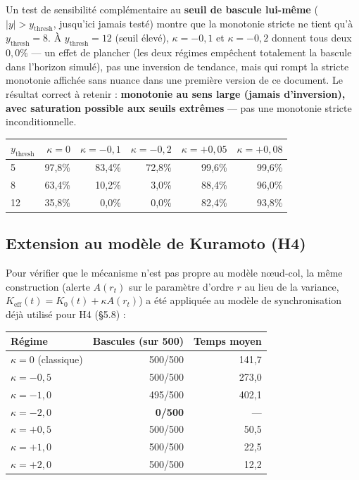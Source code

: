 \documentclass[11pt,a4paper]{article}
\begin{document}
\begin{remarque}
Un test de sensibilité complémentaire au \textbf{seuil de bascule
lui-même} ($|y|>y_{\text{thresh}}$, jusqu'ici jamais testé) montre que la
monotonie stricte ne tient qu'à $y_{\text{thresh}}=8$. À
$y_{\text{thresh}}=12$ (seuil élevé), $\kappa=-0{,}1$ et $\kappa=-0{,}2$
donnent tous deux $0{,}0\%$ — un effet de plancher (les deux régimes
empêchent totalement la bascule dans l'horizon simulé), pas une
inversion de tendance, mais qui rompt la stricte monotonie affichée sans
nuance dans une première version de ce document. Le résultat correct à
retenir : \textbf{monotonie au sens large (jamais d'inversion), avec
saturation possible aux seuils extrêmes} — pas une monotonie stricte
inconditionnelle.
\begin{center}
\begin{tabular}{@{}lrrrrr@{}}
\toprule
$y_{\text{thresh}}$ & $\kappa{=}0$ & $\kappa{=}{-}0{,}1$ & $\kappa{=}{-}0{,}2$ & $\kappa{=}{+}0{,}05$ & $\kappa{=}{+}0{,}08$ \\
\midrule
5  & 97,8\% & 83,4\% & 72,8\% & 99,6\% & 99,6\% \\
8  & 63,4\% & 10,2\% & 3,0\%  & 88,4\% & 96,0\% \\
12 & 35,8\% & 0,0\%  & 0,0\%  & 82,4\% & 93,8\% \\
\bottomrule
\end{tabular}
\end{center}
\end{remarque}

\subsection{Extension au modèle de Kuramoto (H4)}

Pour vérifier que le mécanisme n'est pas propre au modèle nœud-col, la
même construction (alerte $A(r_t)$ sur le paramètre d'ordre $r$ au lieu
de la variance, $K_{\text{eff}}(t) = K_0(t) + \kappa A(r_t)$) a été
appliquée au modèle de synchronisation déjà utilisé pour H4 (§5.8) :

\begin{center}
\begin{tabular}{@{}lrr@{}}
\toprule
Régime & Bascules (sur 500) & Temps moyen \\
\midrule
$\kappa=0$ (classique) & 500/500 & 141,7 \\
$\kappa=-0{,}5$ & 500/500 & 273,0 \\
$\kappa=-1{,}0$ & 495/500 & 402,1 \\
$\kappa=-2{,}0$ & \textbf{0/500} & — \\
$\kappa=+0{,}5$ & 500/500 & 50,5 \\
$\kappa=+1{,}0$ & 500/500 & 22,5 \\
$\kappa=+2{,}0$ & 500/500 & 12,2 \\
\bottomrule
\end{tabular}
\end{center}
\end{document}
